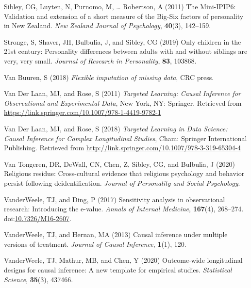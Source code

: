 \documentclass[
  singlecolumn]{article}
\newlength{\cslhangindent}
\newenvironment{CSLReferences}[2] %
 {\begin{list}{}{%
  \setlength{\itemindent}{0pt}
  \setlength{\leftmargin}{0pt}
  \setlength{\parsep}{0pt}
  \ifodd #1
   \setlength{\leftmargin}{\cslhangindent}
   \setlength{\itemindent}{-1\cslhangindent}
  \fi
  \setlength{\itemsep}{#2\baselineskip}}}
 {\end{list}}
\begin{document}
\begin{CSLReferences}{1}{0}
Sibley, CG, Luyten, N, Purnomo, M, \ldots{} Robertson, A (2011) The
Mini-IPIP6: Validation and extension of a short measure of the Big-Six
factors of personality in New Zealand. \emph{New Zealand Journal of
Psychology}, \textbf{40}(3), 142--159.

Stronge, S, Shaver, JH, Bulbulia, J, and Sibley, CG (2019) Only children
in the 21st century: Personality differences between adults with and
without siblings are very, very small. \emph{Journal of Research in
Personality}, \textbf{83}, 103868.

Van Buuren, S (2018) \emph{Flexible imputation of missing data}, CRC
press.

Van Der Laan, MJ, and Rose, S (2011) \emph{Targeted Learning: Causal
Inference for Observational and Experimental Data}, New York, NY:
Springer. Retrieved from
\url{https://link.springer.com/10.1007/978-1-4419-9782-1}

Van Der Laan, MJ, and Rose, S (2018) \emph{Targeted Learning in Data
Science: Causal Inference for Complex Longitudinal Studies}, Cham:
Springer International Publishing. Retrieved from
\url{http://link.springer.com/10.1007/978-3-319-65304-4}

Van Tongeren, DR, DeWall, CN, Chen, Z, Sibley, CG, and Bulbulia, J
(2020) Religious residue: Cross-cultural evidence that religious
psychology and behavior persist following deidentification.
\emph{Journal of Personality and Social Psychology}.

VanderWeele, TJ, and Ding, P (2017) Sensitivity analysis in
observational research: Introducing the e-value. \emph{Annals of
Internal Medicine}, \textbf{167}(4), 268--274.
doi:\href{https://doi.org/10.7326/M16-2607}{10.7326/M16-2607}.

VanderWeele, TJ, and Hernan, MA (2013) Causal inference under multiple
versions of treatment. \emph{Journal of Causal Inference},
\textbf{1}(1), 120.

VanderWeele, TJ, Mathur, MB, and Chen, Y (2020) Outcome-wide
longitudinal designs for causal inference: A new template for empirical
studies. \emph{Statistical Science}, \textbf{35}(3), 437466.


\end{CSLReferences}
\end{document}
